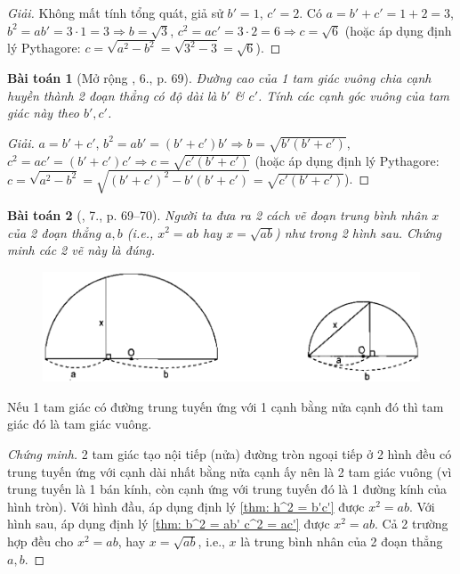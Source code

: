\documentclass{article}
\newtheorem{baitoan}{Bài toán}
\begin{document}
\begin{proof}[Giải]
	Không mất tính tổng quát, giả sử $b' = 1$, $c' = 2$. Có $a = b' + c' = 1 + 2 = 3$, $b^2 = ab' = 3\cdot1 = 3\Rightarrow b = \sqrt{3}$, $c^2 = ac' = 3\cdot2 = 6\Rightarrow c = \sqrt{6}$ (hoặc áp dụng định lý Pythagore: $c = \sqrt{a^2 - b^2} = \sqrt{3^2 - 3} = \sqrt{6}$).
\end{proof}

\begin{baitoan}[Mở rộng \cite{SGK_Toan_9_tap_1}, 6., p. 69]
	Đường cao của 1 tam giác vuông chia cạnh huyền thành 2 đoạn thẳng có độ dài là $b'$ \& $c'$. Tính các cạnh góc vuông của tam giác này theo $b',c'$.
\end{baitoan}

\begin{proof}[Giải]
	$a = b' + c'$, $b^2 = ab' = (b' + c')b'\Rightarrow b = \sqrt{b'(b' + c')}$, $c^2 = ac' = (b' + c')c'\Rightarrow c = \sqrt{c'(b' + c')}$ (hoặc áp dụng định lý Pythagore: $c = \sqrt{a^2 - b^2} = \sqrt{(b' + c')^2 - b'(b' + c')} = \sqrt{c'(b' + c')}$).
\end{proof}

\begin{baitoan}[\cite{SGK_Toan_9_tap_1}, 7., p. 69--70]
	Người ta đưa ra 2 cách vẽ đoạn trung bình nhân $x$ của 2 đoạn thẳng $a,b$ (i.e., $x^2 = ab$ hay $x = \sqrt{ab}$) như trong 2 hình sau. Chứng minh các 2 vẽ này là đúng.
	\begin{figure}[H]
		\centering
		\includegraphics[scale=.25]{SGK_Toan_9_8_9_p69}
	\end{figure}
\end{baitoan}
 Nếu 1 tam giác có đường trung tuyến ứng với 1 cạnh bằng nửa cạnh đó thì tam giác đó là tam giác vuông.

\begin{proof}[Chứng minh]
	2 tam giác tạo nội tiếp (nửa) đường tròn ngoại tiếp ở 2 hình đều có trung tuyến ứng với cạnh dài nhất bằng nửa cạnh ấy nên là 2 tam giác vuông (vì trung tuyến là 1 bán kính, còn cạnh ứng với trung tuyến đó là 1 đường kính của hình tròn). Với hình đầu, áp dụng định lý \ref{thm: h^2 = b'c'} được $x^2 = ab$. Với hình sau, áp dụng định lý \ref{thm: b^2 = ab' c^2 = ac'} được $x^2 = ab$. Cả 2 trường hợp đều cho $x^2 = ab$, hay $x = \sqrt{ab}$, i.e., $x$ là trung bình nhân của 2 đoạn thẳng $a,b$.
\end{proof}
\end{document}
